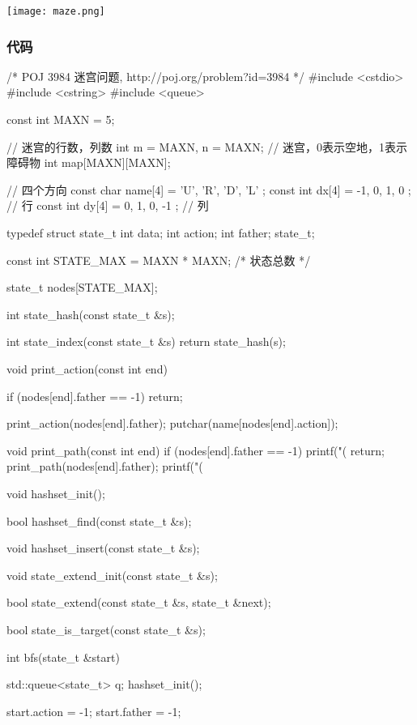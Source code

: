 \begin{center}
\texttt{[image: maze.png]}\\
\label{fig:maze}
\end{center}

\subsubsection{代码}
\begin{Codex}[label=maze.c]
/* POJ 3984 迷宫问题, http://poj.org/problem?id=3984 */
#include <cstdio>
#include <cstring>
#include <queue>

const int MAXN = 5;

// 迷宫的行数，列数
int m = MAXN, n = MAXN;
// 迷宫，0表示空地，1表示障碍物
int map[MAXN][MAXN];

// 四个方向
const char name[4] = { 'U', 'R', 'D', 'L' };
const int dx[4] = { -1, 0, 1, 0 }; // 行
const int dy[4] = { 0, 1, 0, -1 }; // 列


typedef struct state_t {
    int data;
    int action;
    int father;
} state_t;

const int STATE_MAX = MAXN * MAXN;  /* 状态总数 */

state_t nodes[STATE_MAX];

int state_hash(const state_t &s);

int state_index(const state_t &s) {
    return state_hash(s);
}

void print_action(const int end) {
    if (nodes[end].father == -1) return;

    print_action(nodes[end].father);
    putchar(name[nodes[end].action]);
}

void print_path(const int end) {
    if (nodes[end].father == -1) {
        printf("(%
        return;
    }
    print_path(nodes[end].father);
    printf("(%
}

void hashset_init();

bool hashset_find(const state_t &s);

void hashset_insert(const state_t &s);

void state_extend_init(const state_t &s);

bool state_extend(const state_t &s, state_t &next);

bool state_is_target(const state_t &s);

int bfs(state_t &start) {
    std::queue<state_t> q;
    hashset_init();

    start.action = -1;
    start.father = -1;

}
\end{Codex}
